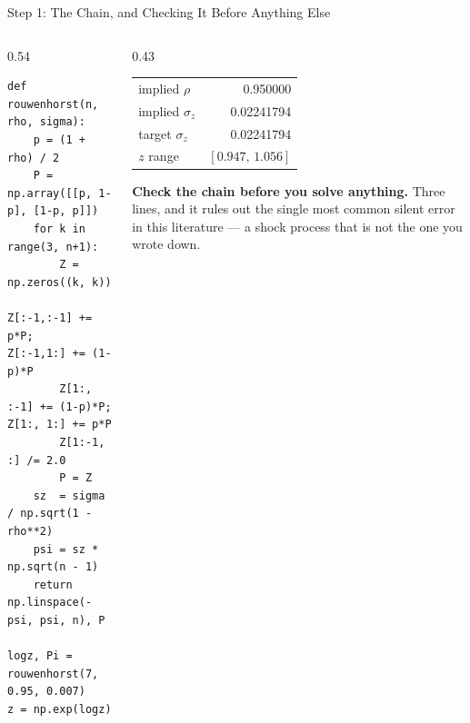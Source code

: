 \begin{frame}[fragile]{Step 1: The Chain, and Checking It Before Anything Else}
\begin{columns}[T]
\begin{column}{0.54\textwidth}
\begin{lstlisting}
def rouwenhorst(n, rho, sigma):
    p = (1 + rho) / 2
    P = np.array([[p, 1-p], [1-p, p]])
    for k in range(3, n+1):
        Z = np.zeros((k, k))
        Z[:-1,:-1] += p*P;     Z[:-1,1:] += (1-p)*P
        Z[1:, :-1] += (1-p)*P; Z[1:, 1:] += p*P
        Z[1:-1, :] /= 2.0
        P = Z
    sz  = sigma / np.sqrt(1 - rho**2)
    psi = sz * np.sqrt(n - 1)
    return np.linspace(-psi, psi, n), P

logz, Pi = rouwenhorst(7, 0.95, 0.007)
z = np.exp(logz)
\end{lstlisting}
\end{column}
\begin{column}{0.43\textwidth}
\small
\begin{center}\footnotesize
\begin{tabularx}{\linewidth}{@{}>{\raggedright\arraybackslash}X r@{}}
\toprule
implied $\rho$ & 0.950000 \\
implied $\sigma_z$ & 0.02241794 \\
target $\sigma_z$ & 0.02241794 \\
$z$ range & $[0.947,\,1.056]$ \\
\bottomrule
\end{tabularx}
\end{center}
\vspace{1mm}
\begin{takeawaybox}\footnotesize
\textbf{Check the chain before you solve anything.} Three lines, and it rules out the single most common silent error in this literature --- a shock process that is not the one you wrote down.
\end{takeawaybox}
\end{column}
\end{columns}
\end{frame}

